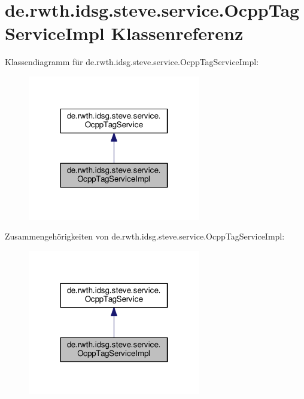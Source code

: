 \hypertarget{classde_1_1rwth_1_1idsg_1_1steve_1_1service_1_1_ocpp_tag_service_impl}{\section{de.\-rwth.\-idsg.\-steve.\-service.\-Ocpp\-Tag\-Service\-Impl Klassenreferenz}
\label{classde_1_1rwth_1_1idsg_1_1steve_1_1service_1_1_ocpp_tag_service_impl}
}


Klassendiagramm für de.\-rwth.\-idsg.\-steve.\-service.\-Ocpp\-Tag\-Service\-Impl\-:\nopagebreak
\begin{figure}[H]
\begin{center}
\leavevmode
\includegraphics[width=214pt]{classde_1_1rwth_1_1idsg_1_1steve_1_1service_1_1_ocpp_tag_service_impl__inherit__graph}
\end{center}
\end{figure}


Zusammengehörigkeiten von de.\-rwth.\-idsg.\-steve.\-service.\-Ocpp\-Tag\-Service\-Impl\-:\nopagebreak
\begin{figure}[H]
\begin{center}
\leavevmode
\includegraphics[width=214pt]{classde_1_1rwth_1_1idsg_1_1steve_1_1service_1_1_ocpp_tag_service_impl__coll__graph}
\end{center}
\end{figure}
